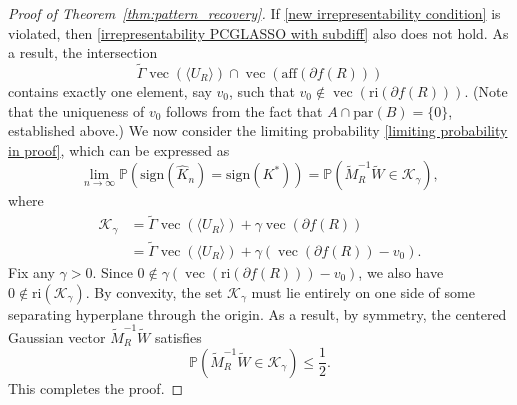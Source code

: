 \documentclass[12pt]{amsart}
\numberwithin{equation}{section}
\numberwithin{equation}{section}
\theoremstyle{plain}
\theoremstyle{definition}
\newcommand{\sign}{\mathrm{sign}}
\begin{document}
\begin{proof}[Proof of Theorem~\ref{thm:pattern_recovery}]
If \eqref{new irrepresentability condition} is violated, then \eqref{irrepresentability PCGLASSO with subdiff} also does not hold. As a result, the intersection
\begin{equation*}
\tilde\Gamma \operatorname{vec}(\langle U_{R}\rangle) \cap \operatorname{vec}(\mathrm{aff}(\partial f(R)))
\end{equation*}
contains exactly one element, say $v_0$, such that $v_0\notin\operatorname{vec}(\mathrm{ri}(\partial f(R)))$.  (Note that the uniqueness of $v_0$ follows from the fact that \(A \cap \mathrm{par}(B) = \{0\}\), established above.)
We now consider the limiting probability \eqref{limiting probability in proof}, which can be expressed as 
\begin{equation*}
   \lim_{n\rightarrow \infty}\mathbb{P}\left(\sign(\hat{K}_n)=\sign(K^\ast)\right) = \mathbb{P} \left(\tilde{M}_R^{-1}\tilde{W} \in \mathcal{K}_\gamma\right),
\end{equation*}
where 
\begin{align*}
\mathcal{K}_\gamma &= \tilde{\Gamma}\operatorname{vec}(\langle U_R\rangle) + \gamma \operatorname{vec}(\partial f(R))\\
&=\tilde{\Gamma}\operatorname{vec}(\langle U_R\rangle) + \gamma (\operatorname{vec}(\partial f(R)) - v_0).
\end{align*}
Fix any $\gamma > 0$. Since $ 0 \notin \gamma(\operatorname{vec}(\mathrm{ri}(\partial f(R))) - v_0)$,
we also have $0 \notin \mathrm{ri}(\mathcal{K}_{\gamma})$. By convexity, the set $\mathcal{K}_{\gamma}$ must lie entirely on one side of some separating hyperplane through the origin. As a result, by symmetry, the centered Gaussian vector $\tilde{M}_R^{-1}\tilde{W}$ satisfies
\begin{equation*}
\mathbb{P}(\tilde{M}_R^{-1}\tilde{W} \in \mathcal{K}_{\gamma}) \leq \frac{1}{2}.
\end{equation*}
This completes the proof.
\end{proof}







\end{document}
